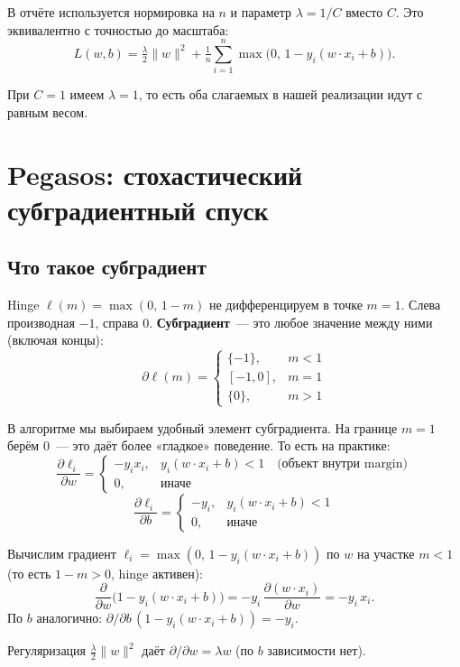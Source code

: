 \documentclass[12pt,a4paper]{article}
\begin{document}
В отчёте используется нормировка на $n$ и параметр $\lambda = 1/C$ вместо $C$. Это эквивалентно с точностью до масштаба:
\[
  L(w, b) = \tfrac{\lambda}{2}\|w\|^2 + \tfrac{1}{n}\sum_{i=1}^n \max\bigl(0,\, 1 - y_i(w \cdot x_i + b)\bigr).
\]

При $C = 1$ имеем $\lambda = 1$, то есть оба слагаемых в нашей реализации идут с равным весом.

\section{Pegasos: стохастический субградиентный спуск}

\subsection{Что такое субградиент}

Hinge $\ell(m) = \max(0,\, 1 - m)$ не дифференцируем в точке $m = 1$. Слева производная $-1$, справа $0$. \textbf{Субградиент}~--- это любое значение между ними (включая концы):
\[
  \partial \ell(m) =
  \begin{cases}
    \{-1\}, & m < 1\\
    [-1, 0], & m = 1\\
    \{0\}, & m > 1
  \end{cases}
\]

В алгоритме мы выбираем удобный элемент субградиента. На границе $m = 1$ берём $0$~--- это даёт более «гладкое» поведение. То есть на практике:
\[
  \frac{\partial \ell_i}{\partial w} =
  \begin{cases}
    -y_i x_i, & y_i(w \cdot x_i + b) < 1 \quad \text{(объект внутри margin)}\\
    0, & \text{иначе}
  \end{cases}
\]
\[
  \frac{\partial \ell_i}{\partial b} =
  \begin{cases}
    -y_i, & y_i(w \cdot x_i + b) < 1\\
    0, & \text{иначе}
  \end{cases}
\]

\begin{derivation}
Вычислим градиент $\ell_i = \max(0,\, 1 - y_i(w \cdot x_i + b))$ по $w$ на участке $m < 1$ (то есть $1 - m > 0$, hinge активен):
\[
  \frac{\partial}{\partial w}\bigl(1 - y_i(w \cdot x_i + b)\bigr)
  = -y_i\, \frac{\partial(w \cdot x_i)}{\partial w}
  = -y_i\, x_i.
\]
По $b$ аналогично: $\partial/\partial b\, (1 - y_i(w \cdot x_i + b)) = -y_i$.

Регуляризация $\tfrac{\lambda}{2}\|w\|^2$ даёт $\partial/\partial w = \lambda w$ (по $b$ зависимости нет).
\end{derivation}
\end{document}

